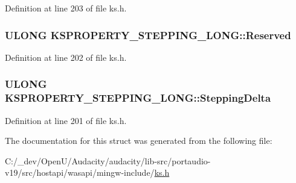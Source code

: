 Definition at line 203 of file ks.\+h.

\subsubsection[{\texorpdfstring{Reserved}{Reserved}}]{\setlength{\rightskip}{0pt plus 5cm}U\+L\+O\+NG K\+S\+P\+R\+O\+P\+E\+R\+T\+Y\+\_\+\+S\+T\+E\+P\+P\+I\+N\+G\+\_\+\+L\+O\+N\+G\+::\+Reserved}\hypertarget{struct_k_s_p_r_o_p_e_r_t_y___s_t_e_p_p_i_n_g___l_o_n_g_abbcdbc86157c65a57dcdbb454d2ae7e0}{}\label{struct_k_s_p_r_o_p_e_r_t_y___s_t_e_p_p_i_n_g___l_o_n_g_abbcdbc86157c65a57dcdbb454d2ae7e0}


Definition at line 202 of file ks.\+h.

\subsubsection[{\texorpdfstring{Stepping\+Delta}{SteppingDelta}}]{\setlength{\rightskip}{0pt plus 5cm}U\+L\+O\+NG K\+S\+P\+R\+O\+P\+E\+R\+T\+Y\+\_\+\+S\+T\+E\+P\+P\+I\+N\+G\+\_\+\+L\+O\+N\+G\+::\+Stepping\+Delta}\hypertarget{struct_k_s_p_r_o_p_e_r_t_y___s_t_e_p_p_i_n_g___l_o_n_g_a366f54fbf259106218876708bbb472b1}{}\label{struct_k_s_p_r_o_p_e_r_t_y___s_t_e_p_p_i_n_g___l_o_n_g_a366f54fbf259106218876708bbb472b1}


Definition at line 201 of file ks.\+h.



The documentation for this struct was generated from the following file\+:\begin{DoxyCompactItemize}
\item 
C\+:/\+\_\+dev/\+Open\+U/\+Audacity/audacity/lib-\/src/portaudio-\/v19/src/hostapi/wasapi/mingw-\/include/\hyperlink{ks_8h}{ks.\+h}\end{DoxyCompactItemize}
